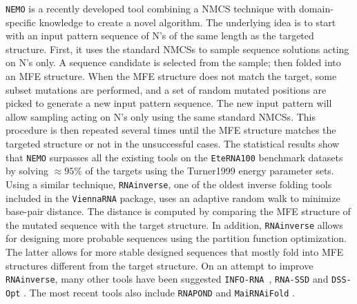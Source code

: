 \texttt{NEMO} \cite{nemo2018} is a recently developed tool combining a \ac{NMCS} technique with domain-specific knowledge to create a novel algorithm. The underlying idea is to start with an input pattern sequence of N's of the same length as the targeted structure. First, it uses the standard \acp{NMCS} to sample sequence solutions acting on N's only. A sequence candidate is selected from the sample; then folded into an \ac{MFE} structure. When the \ac{MFE} structure does not match the target, some subset mutations are performed, and a set of random mutated positions are picked to generate a new input pattern sequence. The new input pattern will allow sampling acting on N's only using the same standard \acp{NMCS}. This procedure is then repeated several times until the \ac{MFE} structure matches the targeted structure or not in the unsuccessful cases. The statistical results show that \texttt{NEMO} surpasses all the existing tools on the \texttt{EteRNA100} benchmark datasets by solving $\approx95\%$ of the targets using the Turner1999 energy parameter sets. Using a similar technique, \texttt{RNAinverse}\cite{lorenz2011viennarna}, one of the oldest inverse folding tools included in the \texttt{ViennaRNA} package, uses an adaptive random walk to minimize base-pair distance. The distance is computed by comparing the \ac{MFE} structure of the mutated sequence with the target structure. In addition, \texttt{RNAinverse} allows for designing more probable sequences using the partition function optimization. The latter allows for more stable designed sequences that mostly fold into \ac{MFE} structures different from the target structure. On an attempt to improve \texttt{RNAinverse}, many other tools have been suggested \texttt{INFO-RNA} \cite{busch2006info}, \texttt{RNA-SSD} \cite{andronescu2004new} and \texttt{DSS-Opt} \cite{matthies2012dynamics}. The most recent tools also include \texttt{RNAPOND} \cite{yao2021taming} and \texttt{MaiRNAiFold} \cite{minuesa2021moirnaifold}.

